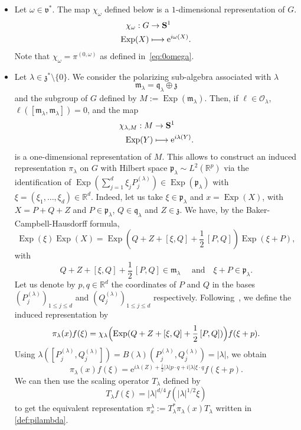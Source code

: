 \documentclass[10pt]{amsart}
\let\mathcal\mathscr
\newcommand\mto{\mathchoice{\longmapsto}{\mapsto}{\mapsto}{\mapsto}}
\newcommand{\rme}{\mathrm{e}}
\DeclareMathOperator{\Exp}{Exp}
\theoremstyle{plain}
\theoremstyle{definition}
\def\R{{\mathbb R}}
\begin{document}
\begin{itemize}
\item
Let $\omega \in \mathfrak v ^*$. The map $\chi_\omega$ defined below is a $1$-dimensional representation of $G$.
\begin{align*}
\chi_\omega :G & \to  {\bf S}^1\\
\Exp (X) & \mto \rme^{i\omega(X)}.
\end{align*}
Note that $\chi_\omega=\pi^{(0,\omega)}$ as defined in~\eqref{eq:0omega}.

\item
Let $\lambda\in \mathfrak z^*\setminus\{0\}$. We consider the polarizing sub-algebra associated with $\lambda$
\[
\mathfrak m_\lambda= \mathfrak q_\lambda \oplus \mathfrak z
\]
and the subgroup of $G$ defined by $M:=\Exp (\mathfrak m_\lambda)$. Then, if $\ell\in\mathcal O_\lambda$, $\ell([\mathfrak m_\lambda, \mathfrak m_\lambda])=0$, and the map
\begin{align*}
\chi_{\lambda,M} :M & \to {\bf S}^1\\
\Exp (Y) & \mto \rme^{i\lambda(Y)}.
\end{align*}
is a one-dimensional representation of $M$. This allows to construct an induced representation $\pi_\lambda$ on $G$ with Hilbert space $\mathfrak p_\lambda\sim L^2(\R^p)$ via the identification of $\Exp(\sum_{j=1}^d \xi_j P^{(\lambda)}_j)\in \Exp(\mathfrak p_\lambda)$ with $\xi=(\xi_1,\dots,\xi_d)\in \R^d$.
Indeed, let us take $\xi\in \mathfrak p_\lambda$ and $x=\Exp (X)$, with $X=P+Q+Z$ and $P\in\mathfrak p_\lambda$, $Q\in \mathfrak q_\lambda$ and $Z\in \mathfrak z$. We have, by the Baker-Campbell-Hausdorff formula,
\[
\Exp(\xi) \Exp (X)= \Exp(Q+Z+[\xi, Q] +\frac 12\,[P,Q]) \Exp (\xi+P),
\]
with
\[
Q+Z+[\xi, Q] +\frac 12\,[P,Q]\in \mathfrak m_\lambda\quad \mbox{ and}\quad \xi+P\in\mathfrak p_\lambda.
\]
Let us denote by $p,q\in\R^d$
the coordinates of $P$ and $Q$ in the bases $(P^{(\lambda)}_j)_{1\leq j\leq d}$ and $(Q^{(\lambda)}_j)_{1\leq j\leq d}$ respectively. Following~\cite{CG}, we define the induced representation by
\[
\pi_\lambda(x) f(\xi)= \chi_\lambda\Bigl(\Exp(Q+Z+[\xi, Q] +\frac 12\,[P,Q])\Bigr) f(\xi +p).
\]
Using $\lambda([P_j^{(\lambda)},Q_j^{(\lambda)}])= B(\lambda)(P_j^{(\lambda)},Q_j^{(\lambda)})= |\lambda| $, we obtain
\[
\pi_\lambda(x) f(\xi) = \rme^{i \lambda(Z) +\frac i 2 |\lambda| p\cdot q+i|\lambda| \xi\cdot q} f(\xi+p).
\]
We can then use the scaling operator $T_\lambda$ defined by
\[
T_\lambda f(\xi)= |\lambda|^{d/4} f(|\lambda|^{1/2}\xi)
\]
to get
the equivalent representation $\pi^\lambda_x := T_\lambda ^* \pi_\lambda(x) T_\lambda$ written in \eqref{def:pilambda}.
\end{itemize}
\end{document}
